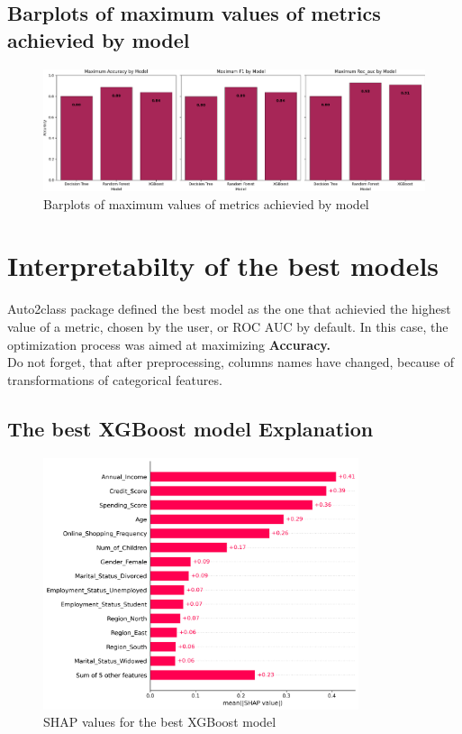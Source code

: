 \documentclass{article}%
\begin{document}
%
\subsection{Barplots of maximum values of metrics achievied by model}%
\label{subsec:Barplotsofmaximumvaluesofmetricsachieviedbymodel}%


\begin{figure}[h!]%
\centering%
\includegraphics[width=460px]{ModelOptimization/barplots_max_metric.png}%
\caption{Barplots of maximum values of metrics achievied by model}%
\end{figure}

%
\newpage%
\section{Interpretabilty of the best models}%
\label{sec:Interpretabiltyofthebestmodels}%
Auto2class package defined the best model as the one that achievied the highest value of a metric, chosen by the user, or ROC AUC by default.%
In this case, the optimization process was aimed at maximizing%
\textbf{ Accuracy.}%
\\%
Do not forget, that after preprocessing, columns names have changed, because of transformations of categorical features.%
\subsection{The best XGBoost model Explanation}%
\label{subsec:ThebestXGBoostmodelExplanation}%


\begin{figure}[h!]%
\centering%
\includegraphics[width=350px]{XAI/XGBoost/global_feature_importance_shap.png}%
\caption{SHAP values for the best XGBoost model}%
\end{figure}
\end{document}
